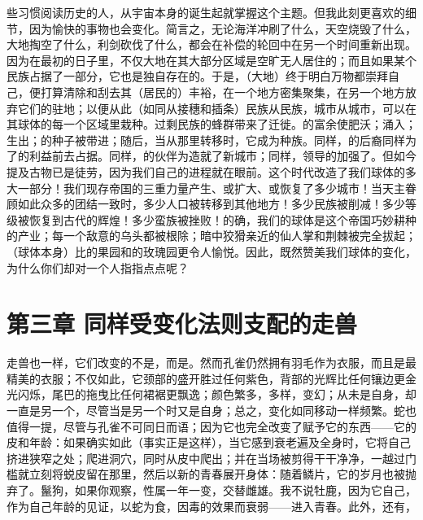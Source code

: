 些习惯阅读历史的人，从宇宙本身的诞生起就掌握这个主题。但我此刻更喜欢的细节，因为愉快的事物也会变化。简言之，无论海洋冲刷了什么，天空烧毁了什么，大地掏空了什么，利剑砍伐了什么，都会在补偿的轮回中在另一个时间重新出现。因为在最初的日子里，不仅大地在其大部分区域是空旷无人居住的；而且如果某个民族占据了一部分，它也是独自存在的。于是，（大地）终于明白万物都崇拜自己，便打算清除和刮去其（居民的）丰裕，在一个地方密集聚集，在另一个地方放弃它们的驻地；以便从此（如同从接穗和插条）民族从民族，城市从城市，可以在其球体的每一个区域里栽种。过剩民族的蜂群带来了迁徙。的富余使肥沃；涌入；生出；的种子被带进；随后，当从那里转移时，它成为种族。同样，的后裔同样为了的利益前去占据。同样，的伙伴为造就了新城市；同样，领导的加强了。但如今提及古物已是徒劳，因为我们自己的进程就在眼前。这个时代改造了我们球体的多大一部分！我们现存帝国的三重力量产生、或扩大、或恢复了多少城市！当天主眷顾如此众多的团结一致时，多少人口被转移到其他地方！多少民族被削减！多少等级被恢复到古代的辉煌！多少蛮族被挫败！的确，我们的球体是这个帝国巧妙耕种的产业；每一个敌意的乌头都被根除；暗中狡猾亲近的仙人掌和荆棘被完全拔起；（球体本身）比的果园和的玫瑰园更令人愉悦。因此，既然赞美我们球体的变化，为什么你们却对一个人指指点点呢？\par


\section{第三章 同样受变化法则支配的走兽}

走兽也一样，它们改变的不是，而是。然而孔雀仍然拥有羽毛作为衣服，而且是最精美的衣服；不仅如此，它颈部的盛开胜过任何紫色，背部的光辉比任何镶边更金光闪烁，尾巴的拖曳比任何裙裾更飘逸；颜色繁多，多样，变幻；从未是自身，却一直是另一个，尽管当是另一个时又是自身；总之，变化如同移动一样频繁。蛇也值得一提，尽管与孔雀不可同日而语；因为它也完全改变了赋予它的东西——它的皮和年龄：如果确实如此（事实正是这样），当它感到衰老遍及全身时，它将自己挤进狭窄之处；爬进洞穴，同时从皮中爬出；并在当场被剪得干干净净，一越过门槛就立刻将蜕皮留在那里，然后以新的青春展开身体：随着鳞片，它的岁月也被抛弃了。鬣狗，如果你观察，性属一年一变，交替雌雄。我不说牡鹿，因为它自己，作为自己年龄的见证，以蛇为食，因毒的效果而衰弱——进入青春。此外，还有，\par

